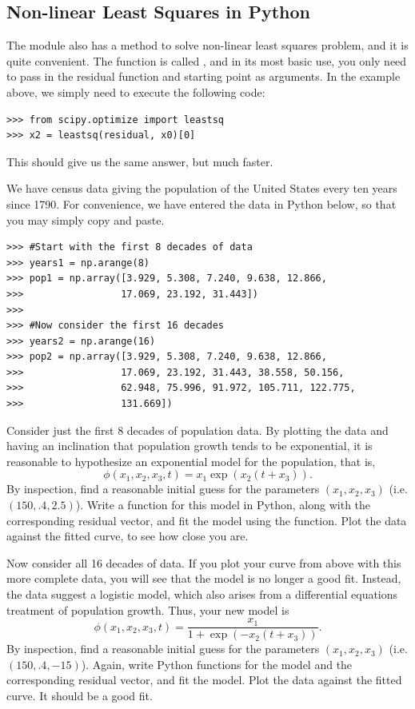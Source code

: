 \subsection*{Non-linear Least Squares in Python}
The module  also has a method to solve non-linear least squares problem, and it
is quite convenient. The function is called , and in its most basic use, you only need
to pass in the residual function and starting point as arguments. In the example above, we simply
need to execute the following code:
\begin{lstlisting}
>>> from scipy.optimize import leastsq
>>> x2 = leastsq(residual, x0)[0]
\end{lstlisting}
This should give us the same answer, but much faster.
\begin{problem}
We have census data giving the population of the United States every ten years since 1790.
For convenience, we have entered the data in Python below, so that you may simply copy and
paste.
\begin{lstlisting}
>>> #Start with the first 8 decades of data
>>> years1 = np.arange(8)
>>> pop1 = np.array([3.929, 5.308, 7.240, 9.638, 12.866,
>>>                 17.069, 23.192, 31.443])
>>>
>>> #Now consider the first 16 decades
>>> years2 = np.arange(16)
>>> pop2 = np.array([3.929, 5.308, 7.240, 9.638, 12.866,
>>>                 17.069, 23.192, 31.443, 38.558, 50.156,
>>>                 62.948, 75.996, 91.972, 105.711, 122.775,
>>>                 131.669])
\end{lstlisting}
Consider just the first 8 decades of population data. By plotting the data and having
an inclination that population growth tends to be exponential, it is reasonable to
hypothesize an exponential model for the population, that is,
$$
\phi(x_1,x_2,x_3,t) = x_1\exp(x_2(t+x_3)).
$$
By inspection, find a reasonable
initial guess for the parameters $(x_1, x_2, x_3)$ (i.e. $(150, .4, 2.5)$).
Write a function for this model in Python, along with the corresponding residual vector,
and fit the model using the  function.  Plot the data against the fitted curve,
to see how close you are.

Now consider all 16 decades of data. If you plot your curve from above with this more complete
data, you will see that the model is no longer a good fit. Instead, the data suggest
a logistic model, which also arises from a differential equations treatment of population growth.
Thus, your new model is
$$
\phi(x_1,x_2,x_3,t) = \frac{x_1}{1+\exp(-x_2(t+x_3))}.
$$
By inspection, find a reasonable
initial guess for the parameters $(x_1, x_2, x_3)$ (i.e. $(150, .4, -15)$).
Again, write Python functions for the model and the corresponding residual vector,
and fit the model. Plot the data against the fitted curve. It should be a good fit.
\end{problem} 